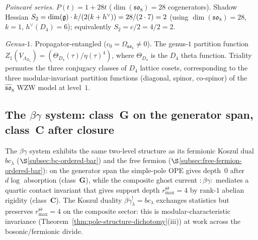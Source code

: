 \begin{computation}
\smallskip
\noindent
\emph{Poincar\'{e} series.}
$P(t) = 1 + 28t$ ($\dim(\mathfrak{so}_8) = 28$ cogenerators).
Shadow Hessian
$S_2 = \dim(\mathfrak{g})\cdot k/(2(k+h^\vee)) = 28/(2 \cdot 7) = 2$
(using $\dim(\mathfrak{so}_8) = 28$, $k = 1$, $h^\vee(D_4) = 6$);
equivalently $S_2 = c/2 = 4/2 = 2$.

\smallskip
\noindent
\emph{Genus-$1$.}
Propagator-entangled ($c_0 = \Omega_{\mathfrak{so}_8} \ne 0$).
The genus-$1$ partition function
$Z_1(V_{\Lambda_{D_4}}) = (\Theta_{D_4}(\tau)/\eta(\tau)^4)$,
where $\Theta_{D_4}$ is the $D_4$ theta function.
Triality permutes the three conjugacy classes of $D_4$
lattice cosets, corresponding to the three modular-invariant
partition functions (diagonal, spinor, co-spinor) of the
$\widehat{\mathfrak{so}}_8$ WZW model at level~$1$.
\end{computation}

\subsection{The $\beta\gamma$ system: class~G on the generator span, class~C after closure}%
\label{subsec:betagamma-ordered-bar}%
%

The $\beta\gamma$ system exhibits the same two-level
structure as its fermionic Koszul dual $bc_\lambda$
($\S$\ref{subsec:bc-ordered-bar}) and the free fermion
($\S$\ref{subsec:free-fermion-ordered-bar}): on the generator span
the simple-pole OPE gives depth~$0$ after $d\log$
absorption (class~$\mathbf{G}$), while the composite
ghost current ${:}\beta\gamma{:}$ mediates a quartic
contact invariant that gives support depth $r^\Theta_{\max}=4$ by
rank-$1$ abelian rigidity (class~$\mathbf{C}$).
The Koszul duality $\beta\gamma_\lambda^! = bc_\lambda$
exchanges statistics but preserves $r^\Theta_{\max}=4$ on
the composite sector: this is modular-characteristic
invariance (Theorem~\ref{thm:pole-structure-dichotomy}(iii))
at work across the bosonic/fermionic divide.

